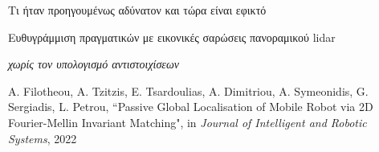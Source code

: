 \begin{frame}{Τι ήταν προηγουμένως αδύνατον και τώρα είναι εφικτό}

  \vspace{2cm}
  Ευθυγράμμιση πραγματικών με εικονικές σαρώσεις πανοραμικού lidar \vspace{0.25cm}

  \textit{χωρίς τον υπολογισμό αντιστοιχίσεων}


  \placebottom
  \tiny A. Filotheou, A. Tzitzis, E. Tsardoulias, A. Dimitriou, A. Symeonidis, G. Sergiadis, L. Petrou, ``Passive Global Localisation of Mobile Robot via 2D Fourier-Mellin Invariant Matching", in \textit{Journal of Intelligent and Robotic Systems}, 2022

\end{frame}
